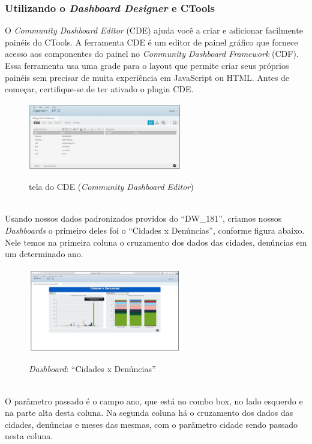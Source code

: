 \subsubsection{Utilizando o \textit{Dashboard Designer} e CTools}

O \textit{Community Dashboard Editor} (CDE) ajuda você a criar e adicionar facilmente pain\'{e}is do CTools. A ferramenta CDE \'{e} um editor de painel gr\'{a}fico que fornece acesso aos componentes do painel no \textit{Community Dashboard Framework} (CDF). Essa ferramenta usa uma grade para o layout que permite criar seus pr\'oprios pain\'{e}is sem precisar de muita experiência em JavaScript ou HTML. Antes de come\c{c}ar, certifique-se de ter ativado o plugin CDE.

\begin{figure}[H]
	\vspace*{0,2cm}
    \centering
    \caption{tela do CDE (\textit{Community Dashboard Editor})}
    \includegraphics[width=0.6\textwidth]{./04-figuras/figura-cde}
    \label{fig:ilustfigcde}
\end{figure}
\vspace*{-0,9cm}
{\raggedright {}} \\

Usando nossos dados padronizados providos do ``DW\_181'', criamos nossos \textit{Dashboards} o primeiro deles foi o ``Cidades x Denúncias'', conforme figura abaixo. Nele temos na primeira coluna o cruzamento dos dados das cidades, denúncias em um determinado ano.

\begin{figure}[H]
	\vspace*{0,2cm}
    \centering
    \caption{\textit{Dashboard}: ``Cidades x Denúncias''}
    \includegraphics[width=0.6\textwidth]{./04-figuras/figura-dashboard-cxd}
    \label{fig:ilustfigdcxd}
\end{figure}
\vspace*{-0,9cm}
{\raggedright {}} \\

O par\^{a}metro passado \'{e} o campo ano, que est\'{a} no combo box, no lado esquerdo e na parte alta desta coluna. Na segunda coluna h\'{a} o cruzamento dos dados das cidades, denúncias e meses das mesmas, com o par\^{a}metro cidade sendo passado nesta coluna.